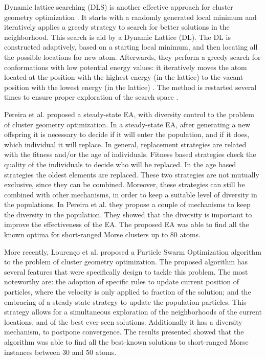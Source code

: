 		Dynamic lattice searching (DLS) is another effective approach for cluster geometry optimization \cite{cheng07}. It starts with a randomly generated local minimum and iteratively applies a greedy strategy to search for better solutions in the neighborhood. This search is aid by a Dynamic Lattice (DL). The DL is constructed adaptively, based on a starting local minimum, and then locating all the possible locations for new atom. Afterwards, they perform a greedy search for conformations with low potential energy values: it iteratively moves the atom located at the position with the highest energy (in the lattice) to the vacant position with the lowest energy (in the lattice) \cite{cheng07, shao04}. The method is restarted several times to ensure proper exploration of the search space \cite{cheng07}.
			
		Pereira et al.\cite{xico09} proposed a steady-state EA, with diversity control to the problem of cluster geometry optimization. In a steady-state EA, after generating a new offspring it is necessary to decide if it will enter the population, and if it does, which individual it will replace. In general, replacement strategies are related with the fitness and/or the age of individuals. Fitness based strategies check the quality of the individuals to decide who will be replaced. In the age based strategies the oldest elements are replaced. These two strategies are not mutually exclusive, since they can be combined. Moreover, these strategies can still be combined with other mechanisms, in order to keep a suitable level of diversity in the populations.
		In Pereira et al.\cite{xico09} they propose a couple of mechanisms to keep the diversity in the population. They showed that the diversity is important to improve the effectiveness of the EA. The proposed EA was able to find all the known optima for short-ranged Morse clusters up to 80 atoms.
		
		More recently, Lourenço et al. \cite{lourenco11} proposed a Particle Swarm Optimization algorithm to the problem of cluster geometry optimization. The proposed algorithm has several features that were specifically design to tackle this problem. The most noteworthy are: the adoption of specific rules to update current position of particles, where the velocity is only applied to fraction of the solution; and the embracing of a steady-state strategy to update the population particles. This strategy allows for a simultaneous exploration of the neighborhoods of the current locations, and of the best ever seen solutions. Additionally it has a diversity mechanism, to postpone convergence.
 		The results presented showed that the algorithm was able to find all the best-known solutions to short-ranged Morse instances between 30 and 50 atoms.

		
